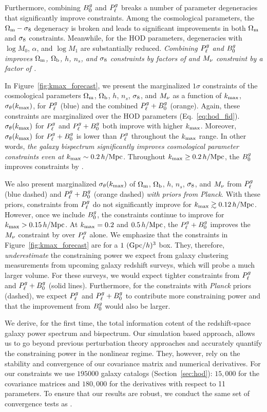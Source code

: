 Furthermore, combining $B^g_0$ and $P^g_{\ell}$ breaks a number of parameter
degeneracies that significantly improve constraints. Among the cosmological
parameters, the $\Omega_{\rm m}-\sigma_8$ degeneracy is broken and leads to significant
improvements in both $\Omega_{\rm m}$ and $\sigma_8$ constraints. Meanwhile, for the HOD 
parameters, degeneracies with $\log M_0$, $\alpha$, and $\log M_1$ are 
substantially reduced. {\em Combining $P^g_{\ell}$ and $B^g_0$ improves $\Omega_{\rm m}$, $\Omega_{\rm b}$, $h$,
$n_s$, and $\sigma_8$ constraints by factors of 
and $M_\nu$ constraint by a factor of .}

In Figure~\ref{fig:kmax_forecast}, we present the marginalized $1\sigma$
constraints of the cosmological parameters $\Omega_{\rm m}$, $\Omega_{\rm b}$, $h$, $n_s$, $\sigma_8$,
and $M_\nu$ as a function of $k_{\rm max}$, $\sigma_\theta(k_{\rm max})$, for $P^g_{\ell}$ (blue)
and the combined $P^g_{\ell} + B^g_0$ (orange). Again, these constraints are
marginalized over the \cite{zheng2007} HOD parameters (Eq.~\ref{eq:hod_fid}). 
$\sigma_\theta(k_{\rm max})$ for $P^g_{\ell}$ and $P^g_{\ell} + B^g_0$ both improve with higher
$k_{\rm max}$. Moreover, $\sigma_\theta(k_{\rm max})$ for $P^g_{\ell}+B^g_0$ is lower than $P^g_{\ell}$
throughout the $k_{\rm max}$ range. In other words, {\em the galaxy bispectrum 
significantly improves cosmological parameter constraints even at
$k_{\rm max}\sim0.2\,h/\mathrm{Mpc}$}. Throughout $k_{\rm max} \ge 0.2\,h/\mathrm{Mpc}$, the $B^g_0$ improves constraints by  
.

We also present marginalized $\sigma_\theta(k_{\rm max})$ of $\Omega_{\rm m}$, $\Omega_{\rm b}$, $h$, $n_s$,
$\sigma_8$, and $M_\nu$ from $P^g_{\ell}$ (blue dashed) and $P^g_{\ell} + B^g_0$ (orange dashed) 
{\em with priors from Planck}. With these priors, constraints from $P^g_{\ell}$ do 
not significantly improve for $k_{\rm max} \gtrsim 0.12\,h/\mathrm{Mpc}$. However, once we include 
$B^g_0$, the constraints continue to improve for $k_{\rm max} > 0.15\,h/\mathrm{Mpc}$. At $k_{\rm max} =
0.2$ and $0.5\,h/\mathrm{Mpc}$, the $P^g_{\ell} + B^g_0$ improves the $M_\nu$ constraint by 
over $P^g_{\ell}$ alone. We emphasize that the constraints in Figure~\ref{fig:kmax_forecast} 
are for a $1~({\rm Gpc}/h)^3$ box. They, therefore, {\em underestimate} the 
constraining power we expect from galaxy clustering measurements from upcoming
galaxy redshift surveys, which will probe a much larger volume. For
these surveys, we would expect tighter constraints from $P^g_{\ell}$ and $P^g_{\ell}+B^g_0$
(solid lines). Furthermore, for the constraints with {\em Planck} priors (dashed), we 
expect $P^g_{\ell}$ and $P^g_{\ell}+B^g_0$ to contribute more constraining power and that the
improvement from $B^g_0$ would also be larger. 

We derive, for the first time, the total information cotent of the redshift-space 
galaxy power spectrum and bispectrum. Our simulation based approach, allows us
to go beyond previous perturbation theory approaches and accurately quantify the 
constraining power in the nonlinear regime. They, however, rely on the
stability and convergence of our covariance matrix and numerical derivatives.  
For our constraints we use $195000$ galaxy catalogs (Section~\ref{sec:hod}): 
$15,000$ for the covariance matrices and $180,000$ for the derivatives with 
respect to 11 parameters. To ensure that our results are robust, we conduct the
same set of convergence tests as \cite{hahn2019}. 

